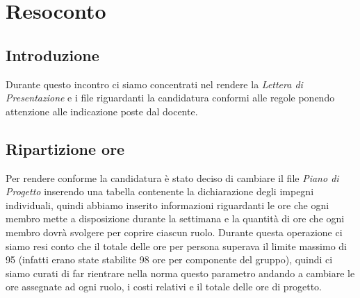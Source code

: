 \section{Resoconto}
\subsection{Introduzione}
Durante questo incontro ci siamo concentrati nel rendere la \textit{Lettera di Presentazione} e i file riguardanti la candidatura conformi alle regole ponendo attenzione alle indicazione poste dal docente. 

\subsection{Ripartizione ore}
Per rendere conforme la candidatura è stato deciso di cambiare il file \textit{Piano di Progetto} inserendo una tabella contenente la dichiarazione degli impegni individuali, quindi abbiamo inserito informazioni riguardanti le ore che ogni membro mette a disposizione durante la settimana e la quantità di ore che ogni membro dovrà svolgere per coprire ciascun ruolo. Durante questa operazione ci siamo resi conto che il totale delle ore per persona superava il limite massimo di 95 (infatti erano state stabilite 98 ore per componente del gruppo), quindi ci siamo curati di far rientrare nella norma questo parametro andando a cambiare le ore assegnate ad ogni ruolo, i costi relativi e il totale delle ore di progetto. 


